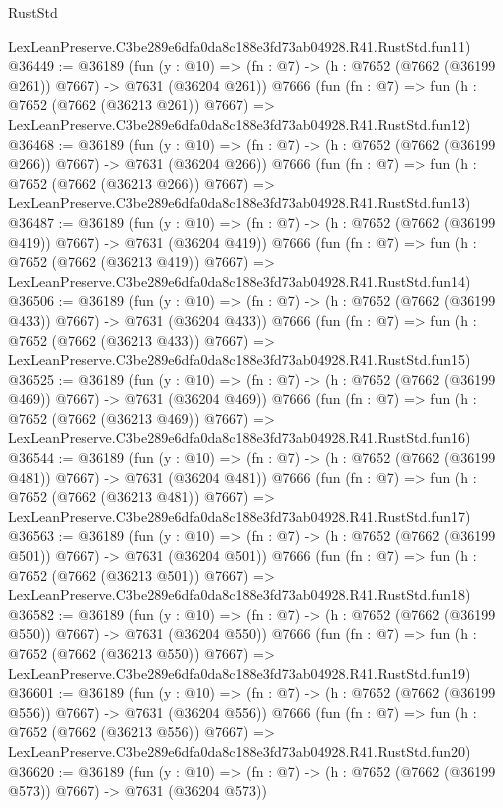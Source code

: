 \begin{lexlean}{RustStd}
\begin{coremodule}
    LexLeanPreserve.C3be289e6dfa0da8c188e3fd73ab04928.R41.RustStd.fun11)
@36449 := @36189
    (fun (y : @10) => (fn : @7) -> (h : @7652 (@7662 (@36199 @261)) @7667) -> @7631 (@36204 @261))
    @7666
    (fun (fn : @7) =>
    fun (h : @7652 (@7662 (@36213 @261)) @7667) =>
    LexLeanPreserve.C3be289e6dfa0da8c188e3fd73ab04928.R41.RustStd.fun12)
@36468 := @36189
    (fun (y : @10) => (fn : @7) -> (h : @7652 (@7662 (@36199 @266)) @7667) -> @7631 (@36204 @266))
    @7666
    (fun (fn : @7) =>
    fun (h : @7652 (@7662 (@36213 @266)) @7667) =>
    LexLeanPreserve.C3be289e6dfa0da8c188e3fd73ab04928.R41.RustStd.fun13)
@36487 := @36189
    (fun (y : @10) => (fn : @7) -> (h : @7652 (@7662 (@36199 @419)) @7667) -> @7631 (@36204 @419))
    @7666
    (fun (fn : @7) =>
    fun (h : @7652 (@7662 (@36213 @419)) @7667) =>
    LexLeanPreserve.C3be289e6dfa0da8c188e3fd73ab04928.R41.RustStd.fun14)
@36506 := @36189
    (fun (y : @10) => (fn : @7) -> (h : @7652 (@7662 (@36199 @433)) @7667) -> @7631 (@36204 @433))
    @7666
    (fun (fn : @7) =>
    fun (h : @7652 (@7662 (@36213 @433)) @7667) =>
    LexLeanPreserve.C3be289e6dfa0da8c188e3fd73ab04928.R41.RustStd.fun15)
@36525 := @36189
    (fun (y : @10) => (fn : @7) -> (h : @7652 (@7662 (@36199 @469)) @7667) -> @7631 (@36204 @469))
    @7666
    (fun (fn : @7) =>
    fun (h : @7652 (@7662 (@36213 @469)) @7667) =>
    LexLeanPreserve.C3be289e6dfa0da8c188e3fd73ab04928.R41.RustStd.fun16)
@36544 := @36189
    (fun (y : @10) => (fn : @7) -> (h : @7652 (@7662 (@36199 @481)) @7667) -> @7631 (@36204 @481))
    @7666
    (fun (fn : @7) =>
    fun (h : @7652 (@7662 (@36213 @481)) @7667) =>
    LexLeanPreserve.C3be289e6dfa0da8c188e3fd73ab04928.R41.RustStd.fun17)
@36563 := @36189
    (fun (y : @10) => (fn : @7) -> (h : @7652 (@7662 (@36199 @501)) @7667) -> @7631 (@36204 @501))
    @7666
    (fun (fn : @7) =>
    fun (h : @7652 (@7662 (@36213 @501)) @7667) =>
    LexLeanPreserve.C3be289e6dfa0da8c188e3fd73ab04928.R41.RustStd.fun18)
@36582 := @36189
    (fun (y : @10) => (fn : @7) -> (h : @7652 (@7662 (@36199 @550)) @7667) -> @7631 (@36204 @550))
    @7666
    (fun (fn : @7) =>
    fun (h : @7652 (@7662 (@36213 @550)) @7667) =>
    LexLeanPreserve.C3be289e6dfa0da8c188e3fd73ab04928.R41.RustStd.fun19)
@36601 := @36189
    (fun (y : @10) => (fn : @7) -> (h : @7652 (@7662 (@36199 @556)) @7667) -> @7631 (@36204 @556))
    @7666
    (fun (fn : @7) =>
    fun (h : @7652 (@7662 (@36213 @556)) @7667) =>
    LexLeanPreserve.C3be289e6dfa0da8c188e3fd73ab04928.R41.RustStd.fun20)
@36620 := @36189
    (fun (y : @10) => (fn : @7) -> (h : @7652 (@7662 (@36199 @573)) @7667) -> @7631 (@36204 @573))

\end{coremodule}
\end{lexlean}
